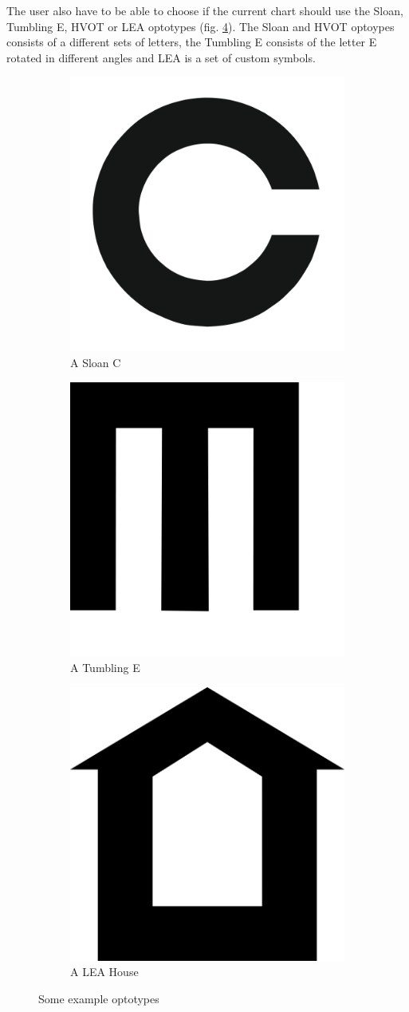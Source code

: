 \documentclass[12pt,a4paper,notitlepage]{report}
\begin{document}
The user also have to be able to choose if the current chart should use the Sloan, Tumbling E, HVOT or LEA optotypes (fig. \ref{fig:optotypes_example1}). The Sloan and HVOT optoypes consists of a different sets of letters, the Tumbling E consists of the letter E rotated in different angles and LEA is a set of custom symbols. \cite{Colenbrander}

\begin{figure}[ht!]
\centering
\begin{subfigure}{.3\textwidth}
  \centering
  \includegraphics[width=.4\linewidth]{images/landholt_c_optotype.png}
  \caption{A Sloan C}
  \label{fig:landholt_c1}
\end{subfigure}%
\begin{subfigure}{.3\textwidth}
  \centering
  \includegraphics[width=.4\linewidth]{images/tumbling_e_optotype.png}
  \caption{A Tumbling E}
  \label{fig:tumbling_e1}
\end{subfigure}
\begin{subfigure}{.3\textwidth}
  \centering
  \includegraphics[width=.4\linewidth]{images/lea_optotype.png}
  \caption{A LEA House}
  \label{fig:lea1}
\end{subfigure}
\caption{Some example optotypes}
\label{fig:optotypes_example1}
\end{figure}
\end{document}
